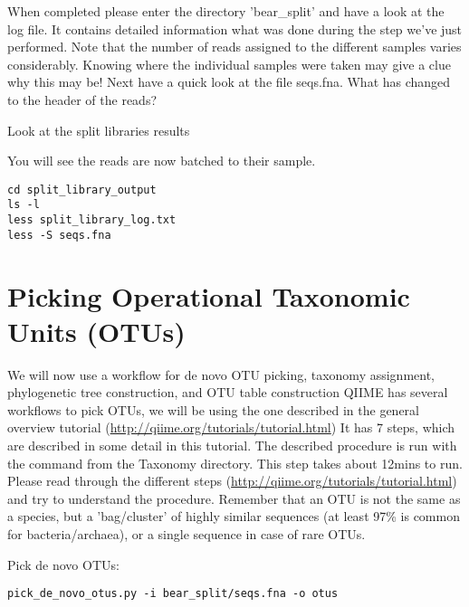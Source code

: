 \begin{questions}
When completed please enter the directory 'bear\_split' and have a look at the log file. It contains detailed information what was done during the step we've just performed. Note that the number of reads assigned to the different samples varies considerably. Knowing where the individual samples were taken may give a clue why this may be! Next have a quick look at the file seqs.fna. What has changed to the header of the reads?

\begin{answer}
Look at the split libraries results
\end{answer}

\end{questions}

\begin{steps}

You will see the reads are now batched to their sample.

\begin{lstlisting}
cd split_library_output
ls -l
less split_library_log.txt
less -S seqs.fna

\end{lstlisting}

\end{steps}

\section{Picking Operational Taxonomic Units (OTUs)}
We will now use a workflow for de novo OTU picking, taxonomy assignment, phylogenetic tree construction, and OTU table construction QIIME has several workflows to pick OTUs, we will be using the one described in the general overview tutorial (\url{http://qiime.org/tutorials/tutorial.html}) It has 7 steps, which are described in some detail in this tutorial. 
The described procedure is run with the command from the Taxonomy directory. This step takes about 12mins to run. Please read through the different steps (\url{http://qiime.org/tutorials/tutorial.html}) and try to understand the procedure. Remember that an OTU is not the same as a species, but a 'bag/cluster' of highly similar sequences (at least 97\% is common for bacteria/archaea), or a single sequence in case of rare OTUs.

\begin{steps}
Pick de novo OTUs:

\begin{lstlisting}
pick_de_novo_otus.py -i bear_split/seqs.fna -o otus   
\end{lstlisting}
\end{steps}

